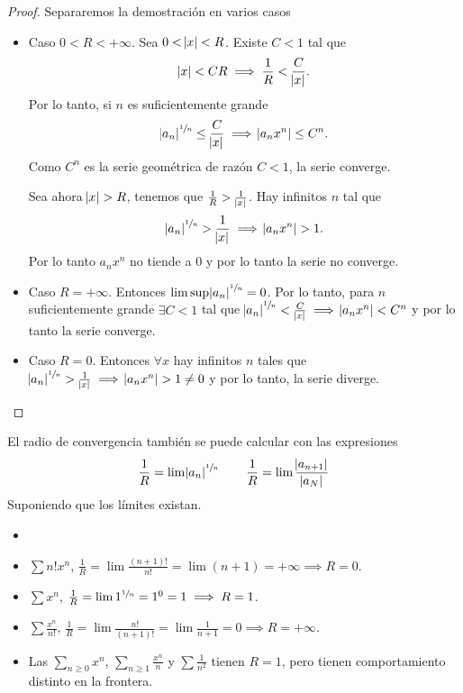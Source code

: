 \begin{proof}
    Separaremos la demostración en varios casos
    \begin{itemize}
        \item Caso $0 < R < + \infty$. Sea $0 < \abs{x} < R$. Existe $C < 1$ tal que
             \[
                \abs{x} < CR \implies \frac{1}{R} < \frac{C}{\abs{x}}.
            \]
            Por lo tanto, si $n$ es suficientemente grande
            \[
                \abs{a_n}^{\sfrac{1}{n}} \leq \frac{C}{\abs{x}} \implies
                \abs{a_nx^n} \leq C^n.
            \]
            Como $C^n$ es la serie geométrica de razón $C < 1$, la serie converge.

            Sea ahora $\abs{x} > R$, tenemos que $\frac{1}{R} > \frac{1}{\abs{x}}$.
            Hay infinitos $n$ tal que
            \[
                \abs{a_n}^{\sfrac{1}{n}} > \frac{1}{\abs{x}} \implies \abs{a_nx^n} > 1.
            \]
            Por lo tanto $a_nx^n$ no tiende a 0 y por lo tanto la serie no converge.
        \item Caso $R = +\infty$. Entonces $\limsup \abs{a_n}^{\sfrac{1}{n}} = 0$.
            Por lo tanto, para $n$ suficientemente grande $\exists C < 1$ tal que
            $\abs{a_n}^{\sfrac{1}{n}} < \frac{C}{\abs{x}} \implies \abs{a_nx^n} < C^n$ y por lo tanto
            la serie converge.
        \item Caso $R = 0$. Entonces $\forall x$ hay infinitos $n$ tales que
             $\abs{a_n}^{\sfrac{1}{n}} > \frac{1}{\abs{x}} \implies \abs{a_nx^n} > 1 \neq 0$
            y por lo tanto, la serie diverge.
    \end{itemize}
\end{proof}

\begin{obs}
    El radio de convergencia también se puede calcular con las expresiones
    \[
        \frac{1}{R} = \lim \abs{a_n}^{\sfrac{1}{n}} \qquad
        \frac{1}{R} = \lim \frac{\abs{a_{n+1}}}{\abs{a_N}}
    \]
    Suponiendo que los límites existan.
\end{obs}

\begin{example*}
    \begin{itemize}
        \item[]
        \item $\sum n!x^n$, $\frac{1}{R} = \lim \frac{(n+1)!}{n!} = \lim (n+1)
            = +\infty \implies R = 0$.
        \item $\sum x^n$, $\frac{1}{R} = \lim 1^{\sfrac{1}{n}} = 1^0 = 1 \implies
            R = 1$.
        \item $\sum \frac{x^n}{n!}$, $\frac{1}{R} = \lim \frac{n!}{(n+1)!} =
            \lim \frac{1}{n+1} = 0 \implies R = +\infty$.
        \item Las $\sum\limits_{n \geq 0} x^n$, $\sum\limits_{n \geq 1} \frac{x^n}{n}$
            y $\sum \frac{1}{n^2}$ tienen $R = 1$, pero tienen comportamiento
            distinto en la frontera.
    \end{itemize}
\end{example*}

